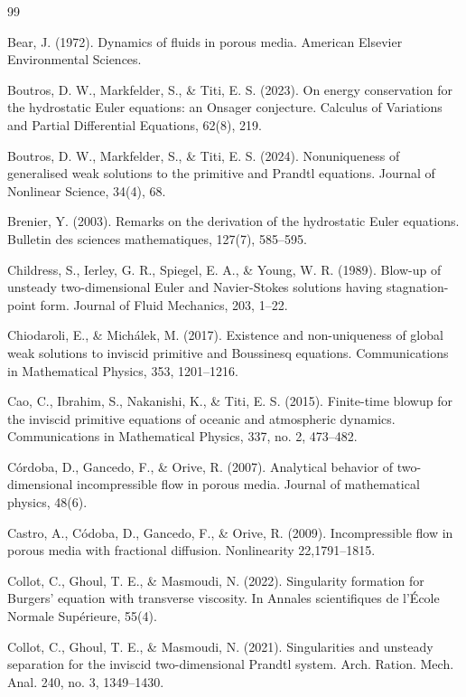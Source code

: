 \documentclass[12pt]{amsart}
\numberwithin{equation}{section}
\numberwithin{equation}{section}
\begin{document}
\begin{thebibliography}{99}

 Bear, J. (1972). Dynamics of fluids in porous media. American Elsevier Environmental Sciences.

 Boutros, D. W., Markfelder, S., \& Titi, E. S. (2023). On energy conservation for the hydrostatic Euler equations: an Onsager conjecture. Calculus of Variations and Partial Differential Equations, 62(8), 219.


 Boutros, D. W., Markfelder, S., \& Titi, E. S. (2024). Nonuniqueness of generalised weak solutions to the primitive and Prandtl equations. Journal of Nonlinear Science, 34(4), 68.

 Brenier, Y. (2003). Remarks on the derivation of the hydrostatic Euler equations. Bulletin des sciences mathematiques, 127(7), 585--595.

 Childress, S., Ierley, G. R., Spiegel, E. A., \& Young, W. R. (1989).  Blow-up of unsteady two-dimensional Euler and Navier-Stokes solutions having stagnation-point form. Journal of Fluid Mechanics, 203, 1--22.

 Chiodaroli, E., \& Mich\'{a}lek, M. (2017). Existence and non-uniqueness of global weak solutions to inviscid primitive and Boussinesq equations. Communications in Mathematical Physics, 353, 1201--1216.

   Cao, C.,   Ibrahim,  S.,   Nakanishi,  K.,  \& Titi, E. S. (2015). Finite-time blowup for the inviscid primitive equations of oceanic and atmospheric dynamics.  Communications in Mathematical Physics,  { 337}, no. 2,  473--482.
 
 C\'{o}rdoba, D., Gancedo, F., \& Orive, R. (2007). Analytical behavior of two-dimensional incompressible flow in porous media. Journal of mathematical physics, 48(6).

   Castro,  A.,   C\'{o}doba,   D.,    Gancedo,  F., \&  Orive, R.  (2009). Incompressible flow in porous media with fractional diffusion.  { Nonlinearity}  { 22},1791--1815.
 
  Collot, C., Ghoul, T. E., \& Masmoudi, N. (2022). Singularity formation for Burgers' equation with transverse viscosity. In Annales scientifiques de l'\'{E}cole Normale Sup\'{e}rieure,  55(4).
 
Collot, C., Ghoul, T. E., \& Masmoudi, N. (2021).  Singularities and unsteady separation for the inviscid two-dimensional Prandtl system.  { Arch. Ration. Mech. Anal. } {  240}, no. 3,  1349--1430.


\end{thebibliography}
\end{document}
